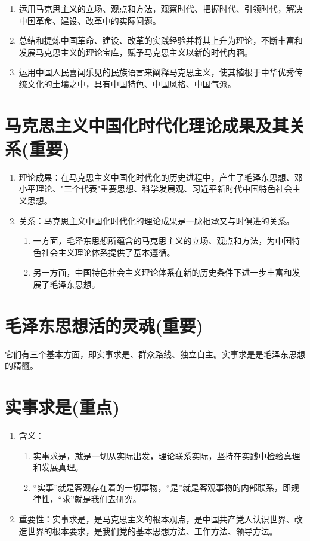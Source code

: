 \documentclass[12pt, a4paper, oneside]{ctexbook}
\begin{document}
\begin{enumerate}
\item 运用马克思主义的立场、观点和方法，观察时代、把握时代、引领时代，解决中国革命、建设、改革中的实际问题。

\item 总结和提炼中国革命、建设、改革的实践经验并将其上升为理论，不断丰富和发展马克思主义的理论宝库，赋予马克思主义以新的时代内涵。

\item 运用中国人民喜闻乐见的民族语言来阐释马克思主义，使其植根于中华优秀传统文化的土壤之中，具有中国特色、中国风格、中国气派。
\end{enumerate}

\section{马克思主义中国化时代化理论成果及其关系(重要)}

\begin{enumerate}
\item 理论成果：在马克思主义中国化时代化的历史进程中，产生了毛泽东思想、邓小平理论、"三个代表"重要思想、科学发展观、习近平新时代中国特色社会主义思想。

\item 关系：马克思主义中国化时代化的理论成果是一脉相承又与时俱进的关系。

\begin{enumerate}[label=(\arabic*)]
\item 一方面，毛泽东思想所蕴含的马克思主义的立场、观点和方法，为中国特色社会主义理论体系提供了基本遵循。

\item 另一方面，中国特色社会主义理论体系在新的历史条件下进一步丰富和发展了毛泽东思想。
\end{enumerate}
\end{enumerate}

\section{毛泽东思想活的灵魂(重要)}
它们有三个基本方面，即实事求是、群众路线、独立自主。实事求是是毛泽东思想的精髓。

\section{实事求是(重点)}

\begin{enumerate}
\item 含义：
\begin{enumerate}[label=(\arabic*)]
\item 实事求是，就是一切从实际出发，理论联系实际，坚持在实践中检验真理和发展真理。

\item “实事”就是客观存在着的一切事物，“是”就是客观事物的内部联系，即规律性，“求”就是我们去研究。
\end{enumerate}

\item 重要性：实事求是，是马克思主义的根本观点，是中国共产党人认识世界、改造世界的根本要求，是我们党的基本思想方法、工作方法、领导方法。
\end{enumerate}
\end{document}
